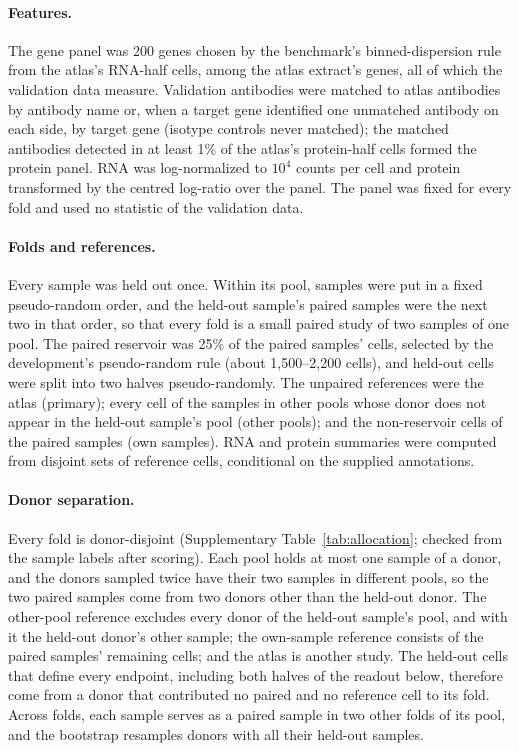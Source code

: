 \paragraph{Features.} The gene panel was 200 genes chosen by the benchmark's binned-dispersion rule from the atlas's RNA-half cells, among the atlas extract's genes, all of which the validation data measure. Validation antibodies were matched to atlas antibodies by antibody name or, when a target gene identified one unmatched antibody on each side, by target gene (isotype controls never matched); the \VlNAntibodies{} matched antibodies detected in at least 1\% of the atlas's protein-half cells formed the protein panel. RNA was log-normalized to $10^4$ counts per cell and protein transformed by the centred log-ratio over the panel. The panel was fixed for every fold and used no statistic of the validation data.

\paragraph{Folds and references.} Every sample was held out once. Within its pool, samples were put in a fixed pseudo-random order, and the held-out sample's paired samples were the next two in that order, so that every fold is a small paired study of two samples of one pool. The paired reservoir was 25\% of the paired samples' cells, selected by the development's pseudo-random rule (about 1,500--2,200 cells), and held-out cells were split into two halves pseudo-randomly. The unpaired references were the atlas (primary); every cell of the samples in other pools whose donor does not appear in the held-out sample's pool (other pools); and the non-reservoir cells of the paired samples (own samples). RNA and protein summaries were computed from disjoint sets of reference cells, conditional on the supplied annotations.

\paragraph{Donor separation.} Every fold is donor-disjoint (Supplementary Table~\ref{tab:allocation}; checked from the sample labels after scoring). Each pool holds at most one sample of a donor, and the \AlNTwoTimepoints{} donors sampled twice have their two samples in different pools, so the two paired samples come from two donors other than the held-out donor. The other-pool reference excludes every donor of the held-out sample's pool, and with it the held-out donor's other sample; the own-sample reference consists of the paired samples' remaining cells; and the atlas is another study. The held-out cells that define every endpoint, including both halves of the readout below, therefore come from a donor that contributed no paired and no reference cell to its fold. Across folds, each sample serves as a paired sample in two other folds of its pool, and the bootstrap resamples donors with all their held-out samples.

